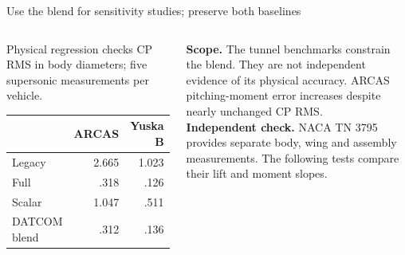 \documentclass[aspectratio=169,10pt]{beamer}
\begin{document}
\begin{frame}{Use the blend for sensitivity studies; preserve both baselines}
\begin{columns}[T,onlytextwidth]
\begin{block}{Physical regression checks}
\small CP RMS in body diameters; five supersonic measurements per vehicle.\\[.5em]
\centering\begin{tabular}{lrr}\toprule
& ARCAS & Yuska B\\\midrule
Legacy & 2.665 & 1.023\\
Full & .318 & .126\\
Scalar & 1.047 & .511\\
DATCOM blend & .312 & .136\\\bottomrule\end{tabular}
\end{block}
\small
\textbf{Scope.} The tunnel benchmarks constrain the blend. They are not independent evidence of its physical accuracy. ARCAS pitching-moment error increases despite nearly unchanged CP RMS.\\[.7em]
\textbf{Independent check.} NACA TN 3795 provides separate body, wing and assembly measurements. The following tests compare their lift and moment slopes.
\end{columns}
\end{frame}


\end{document}
